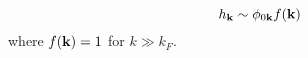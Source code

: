 \begin{equation}\label{eq:pathInt2:hphif}
h_{\mathbf{k}}\sim\phi_{0\mathbf{k}}f(\mathbf{k})
\end{equation}
 where $f(\mathbf{k})=1$ for $k\gg{k_{F}}$.  

%
% 
%

